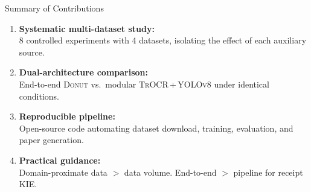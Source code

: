 \documentclass[aspectratio=169,11pt]{beamer}
\newcommand{\donut}{\textsc{Donut}\xspace}
\newcommand{\trocr}{\textsc{TrOCR}\xspace}
\newcommand{\yolo}{\textsc{YOLOv8}\xspace}
\begin{document}
\begin{frame}{Summary of Contributions}
  \begin{enumerate}
    \item \textbf{Systematic multi-dataset study:}\\
          8 controlled experiments with 4 datasets, isolating the effect
          of each auxiliary source.

    \vspace{0.3cm}
    \item \textbf{Dual-architecture comparison:}\\
          End-to-end \donut vs.\ modular \trocr\,+\,\yolo under
          identical conditions.

    \vspace{0.3cm}
    \item \textbf{Reproducible pipeline:}\\
          Open-source code automating dataset download, training,
          evaluation, and paper generation.

    \vspace{0.3cm}
    \item \textbf{Practical guidance:}\\
          Domain-proximate data $>$ data volume.
          End-to-end $>$ pipeline for receipt KIE.
  \end{enumerate}
\end{frame}
\end{document}
